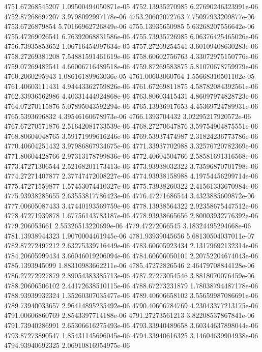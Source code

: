 {4751.67268545207 1.09500494050871e-05
4752.13935270985 6.27690246323991e-06
4752.87268697207 3.9798092997178e-06
4753.20602072763 7.75097933209877e-06
4753.6726879854 5.70166962726849e-06
4755.13935650985 5.63268207556642e-06
4755.47269026541 6.76392068831586e-06
4755.73935726985 6.06376425465026e-06
4756.73935853652 1.06716454997634e-05
4757.27269254541 3.60109408630283e-06
4758.27269381208 7.54881591461619e-06
4758.60602756763 4.33072975150776e-06
4759.07269482541 4.66006716489518e-06
4759.87269583875 5.81070678759979e-06
4760.2060295943 1.08616189963036e-05
4761.00603060764 1.55668310501102e-05
4761.40603111431 4.94443362759826e-06
4761.67269811875 4.58782084392561e-06
4762.33936562986 4.40331444924868e-06
4763.80603415431 4.86097974828723e-06
4764.07270115876 5.07895043592294e-06
4765.13936917653 4.45369724789931e-06
4765.5393696832 4.39546160678973e-06
4766.1393704432 3.02295217920572e-06
4767.67270571876 2.51642081733539e-06
4768.27270647876 3.59754904875551e-06
4768.80604048765 3.59171999616246e-06
4769.53937474987 2.31824236773786e-06
4770.40604251432 3.97986867934675e-06
4771.33937702988 3.32576720782369e-06
4771.80604428766 2.97313178799836e-06
4772.40604504766 2.58581691316568e-06
4773.47271306544 2.52168201173413e-06
4773.93938032322 3.73596870701798e-06
4774.27271407877 2.37747472008227e-06
4774.93938158988 4.19754456299714e-06
4775.47271559877 1.57453074410327e-06
4775.73938260322 2.41561333670984e-06
4775.93938285655 2.63553817786423e-06
4776.47271686544 3.4323885609872e-06
4777.00605087433 3.47440193569759e-06
4778.13938564322 2.92358675447512e-06
4778.47271939878 1.67756143783187e-06
4778.93938665656 2.80003932776392e-06
4779.206053661 2.55326513220699e-06
4779.47272066545 3.18324495294668e-06
4781.13938944323 1.9070004461945e-06
4781.93939045656 5.68130504037011e-07
4782.87272497212 2.63275339716449e-06
4783.60605923434 2.13179692132314e-06
4784.20605999434 3.66046019206094e-06
4784.60606050101 2.20752204674043e-06
4785.1393945099 1.88310983662211e-06
4785.47272826546 2.46479708844128e-06
4786.27272927879 2.89054383385713e-06
4787.27273054546 3.8818070076459e-06
4788.20606506102 2.44172638510115e-06
4788.67273231879 1.78038794487178e-06
4788.93939932324 1.35260307035477e-06
4789.40606658102 3.55659987086691e-06
4789.73940033657 2.96414895235492e-06
4790.40606784769 4.23043377213175e-06
4791.00606860769 2.8543397714188e-06
4791.27273561213 3.82208537867841e-06
4791.73940286991 2.65306616275493e-06
4793.33940489658 3.60344637898044e-06
4793.87273890547 1.85431145696045e-06
4794.33940616325 3.14604639904938e-06
4794.93940692325 2.06910816954975e-06
}
